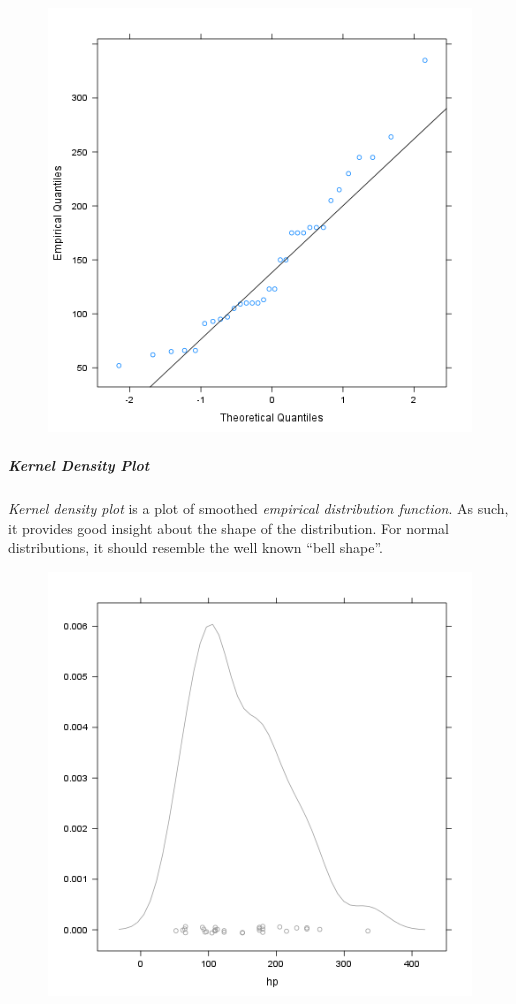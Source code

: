 \documentclass[]{article}
\makeatletter
\def\maxwidth{\ifdim\Gin@nat@width>\linewidth\linewidth
\else\Gin@nat@width\fi}
\let\Oldincludegraphics\includegraphics
\renewcommand{\includegraphics}[1]{\Oldincludegraphics[width=\maxwidth]{#1}}
\makeatother
\begin{document}
\begin{figure}[htbp]
\centering
\includegraphics{17e5c77b83c6e3e636487406decc14c7.png}
\caption{}
\end{figure}

\subparagraph{Kernel Density Plot}

\emph{Kernel density plot} is a plot of smoothed \emph{empirical
distribution function}. As such, it provides good insight about the
shape of the distribution. For normal distributions, it should resemble
the well known ``bell shape''.

\begin{figure}[htbp]
\centering
\includegraphics{e63199776da0ad4146eff538e5ef7af7.png}
\caption{}
\end{figure}
\end{document}
